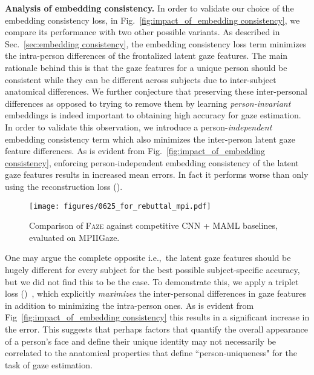 \documentclass[10pt,twocolumn,letterpaper]{article}
\newcommand{\faze}[0]{\textsc{Faze}\xspace}
\newcommand{\Paragraph}[1]
{\vspace{1.5mm} \noindent \textbf{#1}}
\def\ie{i.e.,~}
\begin{document}
\Paragraph{Analysis of embedding consistency.} In order to validate our choice of the embedding consistency loss, in Fig.~\ref{fig:impact_of_embedding consistency}, we compare its performance with two other possible variants. As described in Sec.~\ref{sec:embedding consistency}, the embedding consistency loss term minimizes the intra-person differences of the frontalized latent gaze features. The main rationale behind this is that the gaze features for a unique person should be consistent while they can be different across subjects due to inter-subject anatomical differences. We further conjecture that preserving these inter-personal differences as opposed to trying to remove them by learning \emph{person-invariant} embeddings is indeed important to obtaining high accuracy for gaze estimation. In order to validate this observation, we introduce a person-\emph{independent} embedding consistency term which also minimizes the inter-person latent gaze feature differences. As is evident from Fig.~\ref{fig:impact_of_embedding consistency}, enforcing person-independent embedding consistency of the latent gaze features results in increased mean errors. In fact it performs worse than only using the reconstruction loss (). 

\begin{figure}
    \centering
    \texttt{[image: figures/0625\_for\_rebuttal\_mpi.pdf]}
    \vskip -1mm
    \caption{Comparison of \faze against competitive CNN + MAML baselines, evaluated on MPIIGaze.
    }
    \label{fig:cnn-maml}
    \vskip -3mm
\end{figure}

One may argue the complete opposite \ie the latent gaze features should be hugely different for every subject for the best possible subject-specific accuracy, but we did not find this to be the case. To demonstrate this, we apply a triplet loss ()~\cite{Schroff2015CVPR}, which explicitly \emph{maximizes} the inter-personal differences in gaze features in addition to minimizing the intra-person ones. As is evident from Fig~\ref{fig:impact_of_embedding consistency} this results in a significant increase in the error. This suggests that perhaps factors that quantify the overall appearance of a person's face and define their unique identity may not necessarily be correlated to the anatomical properties that define ``person-uniqueness" for the task of gaze estimation. 
\end{document}
